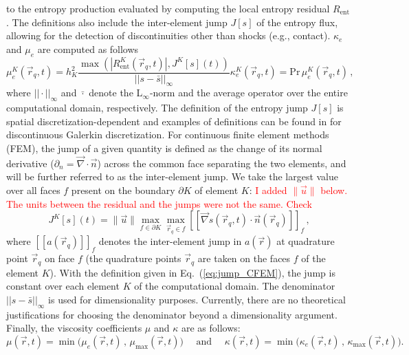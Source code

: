 \documentclass[preprint,10pt]{elsarticle}
\newcommand{\grad}{\vec{\nabla}}
\newcommand{\jmp}[1]{[\![#1]\!]}                     %
\renewcommand{\Pr}{\textrm{Pr}}
\newcommand{\resi}{R_\text{ent}}
\newcommand{\eqt}[1]{Eq.~(\ref{#1})}                     %
\newcommand{\tcr}[1]{\textcolor{red}{#1}}
\begin{document}
to the entropy production evaluated by computing the local entropy residual $\resi$. The definitions also include the 
inter-element jump $J[s]$ of the entropy flux, %
allowing for the detection of discontinuities other than shocks (e.g., contact). $\kappa_e$ and $\mu_e$ are computed 
as follows
%
\begin{subequations}
\label{eq:ent_visc_coeff}
\begin{equation}
\mu^K_e(\vec{r}_q,t) =  h_K^2 \frac{\max\left( | \resi^K(\vec{r}_q,t) |, J^K[s](t) \right)}{|| s - \bar{s} ||_\infty}  
\end{equation}
\begin{equation}
\kappa^K_e(\vec{r}_q,t) = \Pr \, \mu^K_e(\vec{r}_q,t) \,,
\end{equation}
\end{subequations}
%
where $|| \cdot ||_\infty$ and $\bar{\cdot}$ denote the L$_\infty$-norm and the average operator over the entire 
computational domain, respectively. The definition of the entropy jump $J[s]$ is spatial discretization-dependent 
and examples of definitions can be found in \cite{valentin} for discontinuous Galerkin discretization. For 
continuous finite element methods (FEM), the jump of a given quantity is defined as the change of its normal 
derivative ($\partial_n = \grad \cdot \vec{n}$) across the common face separating the two elements, and will 
be further referred to as the inter-element jump. We take the largest value over all faces $f$ present on the 
boundary $\partial K$ of element $K$:
%
\tcr{I added $\| \vec{u} \|$ below. The units between the residual and the jumps were not the same. Check}
\begin{equation}
\label{eq:jump_CFEM}
J^K[s](t) = \| \vec{u} \| \max_{f\in\partial K}  \max_{\vec{r}_q \in f} \jmp{\grad s(\vec{r}_q,t) \cdot \vec{n}(\vec{r}_q) }_f \, ,
\end{equation}
%
where $\jmp{a(\vec{r}_q)}_f$ denotes the inter-element jump in $a(\vec{r})$ at quadrature point $\vec{r}_q$ on face $f$ 
(the quadrature points $\vec{r}_q$ are taken on the faces $f$ of the element $K$). With the definition given in 
\eqt{eq:jump_CFEM}, the jump is constant over each element $K$ of the computational domain. 
The denominator $|| s - \bar{s} ||_\infty$ is used for dimensionality purposes.
Currently, there are no theoretical justifications for choosing the denominator beyond a dimensionality argument. 
Finally, the viscosity coefficients $\mu$ and $\kappa$ are as follows:
%
\begin{equation}
\mu(\vec{r},t)    = \min\Big( \mu_e(\vec{r},t)   \,,\, \mu_{\max}(\vec{r},t)    \Big) 
\quad \text{ and } \quad 
\kappa(\vec{r},t) = \min\Big( \kappa_e(\vec{r},t)\,,\, \kappa_{\max}(\vec{r},t) \Big).
\end{equation}
\end{document}
